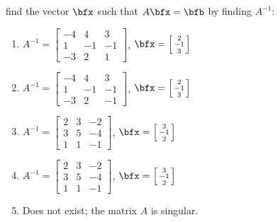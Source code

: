 \begin{questions}
  find the vector $\bfx$ such that $A\bfx=\bfb$ by finding $A^{-1}$:
  \begin{enumerate}[label=\MakeUppercase{\alph*})]
  \item $
    A^{-1}
    =\left[
      \begin{smallmatrix}
        -4&4&3\\
        1&-1&-1\\
        -3&2&1
      \end{smallmatrix}\right]$,
    $\bfx=\left[
      \begin{smallmatrix}
        2\\
        -1\\
        3
      \end{smallmatrix}
    \right]$
  \item $A^{-1}=\left[
    \begin{smallmatrix}
      -4&4&3\\
      1&-1&-1\\
      -3&2&-1
    \end{smallmatrix}\right]$,
  $\bfx= \left[
      \begin{smallmatrix}
        2\\
        -1\\
        3
      \end{smallmatrix}
    \right]$
  \item $
    A^{-1}
    =\left[
      \begin{smallmatrix}
        2&3&-2\\
        3&5&-4\\
        1&1&-1
      \end{smallmatrix}\right]$,
    $\bfx= \left[
      \begin{smallmatrix}
        3\\
        -1\\
        2
      \end{smallmatrix}
    \right]$
  \item $A^{-1}
    =\left[
      \begin{smallmatrix}
        2&3&-2\\
        3&5&-4\\
        1&1&-1
      \end{smallmatrix}
    \right]$,
    $\bfx=\left[
      \begin{smallmatrix}
        3\\
        -1\\
        2
      \end{smallmatrix}\right]$
  \item Does not exist; the matrix $A$ is singular.
  \end{enumerate}
\end{questions}


